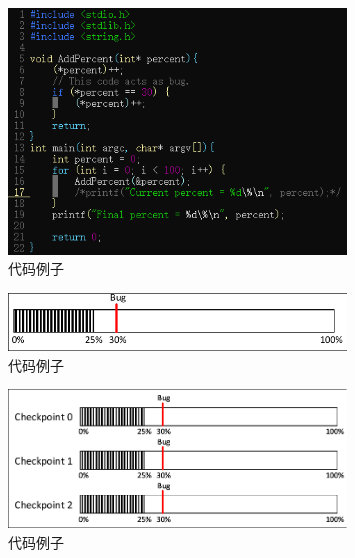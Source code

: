 \documentclass[UTF8]{article}   %
\begin{document}
\begin{figure}[H]
\begin{center}
    \includegraphics[width=0.8\textwidth]{./pic/main}
\end{center}
\caption{代码例子}
\label{fig:main}
\end{figure}

\begin{figure}[H]
\begin{center}
    \includegraphics[width=0.8\textwidth]{./pic/NoCheckpoint}
\end{center}
\caption{代码例子}
\label{fig:main}
\end{figure}

\begin{figure}[H]
\begin{center}
    \includegraphics[width=0.8\textwidth]{./pic/CopyCheckpoint}
\end{center}
\caption{代码例子}
\label{fig:main}
\end{figure}
\end{document}
